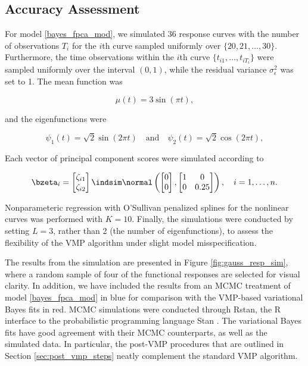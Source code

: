 \documentclass[12pt]{article}
\def\sigsqeps{\sigma^2_{\epsilon}}
\theoremstyle{plain}
\theoremstyle{definition}
\theoremstyle{remark}
\begin{document}

\subsection{Accuracy Assessment}
\label{sec:acc_ass}

For model \eqref{bayes_fpca_mod}, we simulated 36 response curves with the number
of observations $T_i$ for the $i$th curve sampled uniformly over $\{ 20, 21, \dots, 30 \}$. Furthermore, the time
observations within the $i$th curve $\{ t_{i1}, \dots, t_{i T_i} \}$ were sampled uniformly over the interval $(0, 1)$,
while the residual variance $\sigsqeps$ was set to 1. The mean function was

\begin{equation}
	\mu (t) = 3 \sin (\pi t),
\label{mean_func_gauss_sim}
\end{equation}

\noindent and the eigenfunctions were

\begin{equation}
	\psi_1 (t) = \sqrt{2} \sin (2 \pi t) \quad
	\text{and} \quad
	\psi_2 (t) = \sqrt{2} \cos (2 \pi t),
\label{bf_gauss_sim}
\end{equation}

\noindent Each vector of principal component scores were simulated according to

\begin{equation}
	\bzeta_i = \begin{bmatrix}
		\zeta_{i1} \\
		\zeta_{i2}
	\end{bmatrix} \indsim \normal \left(
		\begin{bmatrix}
			0 \\
			0
		\end{bmatrix},
		\begin{bmatrix}
			1 & 0 \\
			0 & 0.25
		\end{bmatrix}
	\right), \quad i = 1, \dots, n.
\label{score_sims}
\end{equation}

\noindent Nonparameteric regression with O'Sullivan penalized splines for the nonlinear curves was performed
with $K = 10$. Finally, the simulations were conducted by setting $L = 3$, rather
than 2 (the number of eigenfunctions), to assess the flexibility of the VMP algorithm under slight model misspecification.

The results from the simulation are presented in Figure \ref{fig:gauss_resp_sim}, where a random sample of
four of the functional responses are selected for visual clarity. In addition, we have included the results from an MCMC
treatment of model \eqref{bayes_fpca_mod} in blue for comparison with
the VMP-based variational Bayes fits in red.
MCMC simulations were conducted through \textsf{Rstan}, the \textsf{R} \cite{r20} interface to the probabilistic
programming language \textsf{Stan} \cite{rstan20}.
The variational Bayes fits have good agreement with their MCMC
counterparts, as well as the simulated data.
In particular, the post-VMP procedures that are outlined in Section \ref{sec:post_vmp_steps} neatly
complement the standard VMP algorithm.
\end{document}
